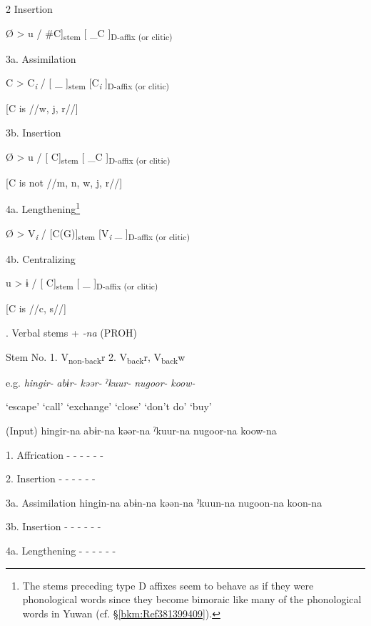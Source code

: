   2  Insertion

    Ø  >  u  /  \#C]\textsubscript{stem}  [ \_C  ]\textsubscript{D-affix (or clitic)}

  3a.  Assimilation

    C  >  C\textit{\textsubscript{i}}  /  [    \_ ]\textsubscript{stem}  [C\textit{\textsubscript{i}}  ]\textsubscript{D-affix (or clitic)}

    [C is //w, j, r//]      

  3b.  Insertion

    Ø  >  u  /  [     C]\textsubscript{stem}  [ \_C  ]\textsubscript{D-affix (or clitic)}

        [C is not //m, n, w, j, r//]  

  4a.  Lengthening\footnote{The stems preceding type D affixes seem to behave as if they were phonological words since they become bimoraic like many of the phonological words in Yuwan (cf. §\ref{bkm:Ref381399409}).}

    Ø  >  V\textit{\textsubscript{i}}  /  [C(G)]\textsubscript{stem}  [V\textit{\textsubscript{i}} \_   ]\textsubscript{D-affix (or clitic)}

  4b.  Centralizing

    u  >  ɨ  /  [    C]\textsubscript{stem}  [ \_  ]\textsubscript{D-affix (or clitic)}

            [C is //c, s//]    

\begin{styleBeschriftung}
\textmd{. Verbal stems +} \textmd{\textit{{}-na}}\textmd{ (PROH)}
\end{styleBeschriftung}

Stem No.  1. V\textsubscript{non-back}r  2. V\textsubscript{back}r, V\textsubscript{back}w

  e.g.  \textit{hingir-}  \textit{abɨr-}  \textit{kəər-}  \textit{ˀkuur-}  \textit{nugoor-}  \textit{koow-}

    ‘escape’  ‘call’  ‘exchange’  ‘close’  ‘don’t do’  ‘buy’

  (Input)  hingir-na  abɨr-na  kəər-na  ˀkuur-na  nugoor-na  koow-na

1.  Affrication  {}-  {}-  {}-  {}-  {}-  {}-

2.  Insertion  {}-  {}-  {}-  {}-  {}-  {}-

3a.  Assimilation  hingin-na  abɨn-na  kəən-na  ˀkuun-na  nugoon-na  koon-na

3b.  Insertion  {}-  {}-  {}-  {}-  {}-  {}-

4a.  Lengthening  {}-  {}-  {}-  {}-  {}-  {}-

